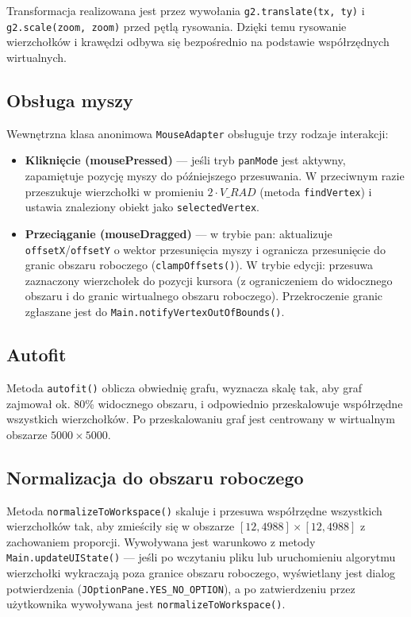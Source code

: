 \documentclass[a4paper, 11pt]{article}
\begin{document}
Transformacja realizowana jest przez wywołania \texttt{g2.translate(tx, ty)}
i \texttt{g2.scale(zoom, zoom)} przed pętlą rysowania. Dzięki temu
rysowanie wierzchołków i krawędzi odbywa się bezpośrednio na podstawie
współrzędnych wirtualnych.

\subsection{Obsługa myszy}

Wewnętrzna klasa anonimowa \texttt{MouseAdapter} obsługuje trzy rodzaje
interakcji:

\begin{itemize}
  \item \textbf{Kliknięcie (mousePressed)} --- jeśli tryb \texttt{panMode}
    jest aktywny, zapamiętuje pozycję myszy do późniejszego przesuwania.
    W przeciwnym razie przeszukuje wierzchołki w promieniu
    $2 \cdot V\_RAD$ (metoda \texttt{findVertex}) i ustawia znaleziony
    obiekt jako \texttt{selectedVertex}.

  \item \textbf{Przeciąganie (mouseDragged)} --- w trybie pan:
    aktualizuje \texttt{offsetX}/\texttt{offsetY} o wektor przesunięcia
    myszy i ogranicza przesunięcie do granic obszaru roboczego
    (\texttt{clampOffsets()}). W trybie edycji: przesuwa zaznaczony
    wierzchołek do pozycji kursora (z ograniczeniem do widocznego
    obszaru i do granic wirtualnego obszaru roboczego). Przekroczenie
    granic zgłaszane jest do \texttt{Main.notifyVertexOutOfBounds()}.
\end{itemize}

\subsection{Autofit}

Metoda \texttt{autofit()} oblicza obwiednię grafu, wyznacza skalę
tak, aby graf zajmował ok. 80\% widocznego obszaru, i odpowiednio
przeskalowuje współrzędne wszystkich wierzchołków. Po przeskalowaniu
graf jest centrowany w wirtualnym obszarze $5000 \times 5000$.

\subsection{Normalizacja do obszaru roboczego}

Metoda \texttt{normalizeToWorkspace()} skaluje i przesuwa współrzędne
wszystkich wierzchołków tak, aby zmieściły się w obszarze
$[12, 4988] \times [12, 4988]$ z zachowaniem proporcji. Wywoływana
jest warunkowo z metody \texttt{Main.updateUIState()} --- jeśli po wczytaniu pliku lub uruchomieniu algorytmu wierzchołki wykraczają poza granice obszaru roboczego, wyświetlany jest dialog potwierdzenia (\texttt{JOptionPane.YES\_NO\_OPTION}), a po zatwierdzeniu przez użytkownika wywoływana jest \texttt{normalizeToWorkspace()}.
\end{document}
